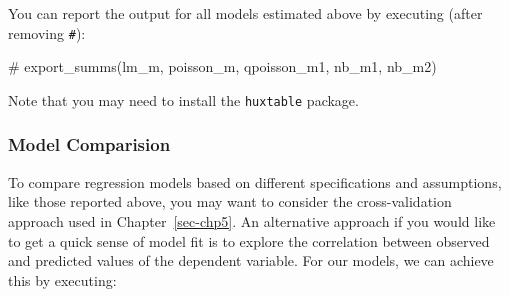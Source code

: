 \documentclass[
  letterpaper,
  DIV=11,
  numbers=noendperiod,
  oneside]{scrreprt}
\newenvironment{Shaded}{\begin{snugshade}}{\end{snugshade}}
\newcommand{\CommentTok}[1]{\textcolor[rgb]{0.37,0.37,0.37}{#1}}
\begin{document}
You can report the output for all models estimated above by executing
(after removing \texttt{\#}):

\begin{Shaded}
\begin{Highlighting}[]
\CommentTok{\# export\_summs(lm\_m, poisson\_m, qpoisson\_m1, nb\_m1, nb\_m2)}
\end{Highlighting}
\end{Shaded}

Note that you may need to install the \texttt{huxtable} package.

\subsubsection{Model Comparision}\label{model-comparision}

To compare regression models based on different specifications and
assumptions, like those reported above, you may want to consider the
cross-validation approach used in Chapter~\ref{sec-chp5}. An alternative
approach if you would like to get a quick sense of model fit is to
explore the correlation between observed and predicted values of the
dependent variable. For our models, we can achieve this by executing:
\end{document}
